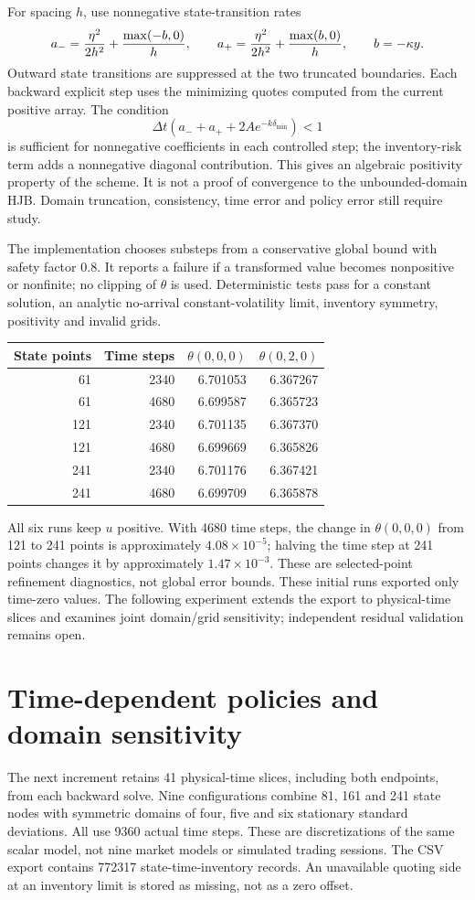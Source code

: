 For spacing $h$, use nonnegative state-transition rates
\[
 a_-={\eta^2\over2h^2}+{\max(-b,0)\over h},\qquad
 a_+={\eta^2\over2h^2}+{\max(b,0)\over h},\qquad b=-\kappa y.
\]
Outward state transitions are suppressed at the two truncated boundaries. Each backward explicit step uses the minimizing quotes computed from the current positive array. The condition
\[
 \Delta t\left(a_-+a_++2Ae^{-k\delta_{\min}}\right)<1
\]
is sufficient for nonnegative coefficients in each controlled step; the inventory-risk term adds a nonnegative diagonal contribution. This gives an algebraic positivity property of the scheme. It is not a proof of convergence to the unbounded-domain HJB. Domain truncation, consistency, time error and policy error still require study.

The implementation chooses substeps from a conservative global bound with safety factor $0.8$. It reports a failure if a transformed value becomes nonpositive or nonfinite; no clipping of $\theta$ is used. Deterministic tests pass for a constant solution, an analytic no-arrival constant-volatility limit, inventory symmetry, positivity and invalid grids.

\begin{center}
\begin{tabular}{@{}rrrr@{}}
\toprule
State points & Time steps & $\theta(0,0,0)$ & $\theta(0,2,0)$\\
\midrule
61 & 2340 & 6.701053 & 6.367267\\
61 & 4680 & 6.699587 & 6.365723\\
121 & 2340 & 6.701135 & 6.367370\\
121 & 4680 & 6.699669 & 6.365826\\
241 & 2340 & 6.701176 & 6.367421\\
241 & 4680 & 6.699709 & 6.365878\\
\bottomrule
\end{tabular}
\end{center}
All six runs keep $u$ positive. With 4680 time steps, the change in $\theta(0,0,0)$ from 121 to 241 points is approximately $4.08\times10^{-5}$; halving the time step at 241 points changes it by approximately $1.47\times10^{-3}$. These are selected-point refinement diagnostics, not global error bounds. These initial runs exported only time-zero values. The following experiment extends the export to physical-time slices and examines joint domain/grid sensitivity; independent residual validation remains open.

\section{Time-dependent policies and domain sensitivity}
The next increment retains 41 physical-time slices, including both endpoints, from each backward solve. Nine configurations combine 81, 161 and 241 state nodes with symmetric domains of four, five and six stationary standard deviations. All use 9360 actual time steps. These are discretizations of the same scalar model, not nine market models or simulated trading sessions. The CSV export contains 772317 state-time-inventory records. An unavailable quoting side at an inventory limit is stored as missing, not as a zero offset.

